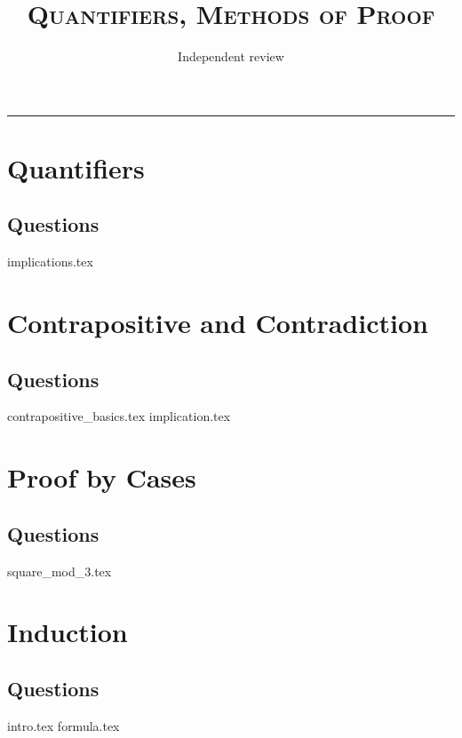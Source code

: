 \documentclass{exam}
\title{\textsc{Quantifiers, Methods of Proof}}
\date{Independent review}
\begin{document}
\maketitle
\rule{\textwidth}{0.15em}
\fontsize{12}{15}\selectfont
\thispagestyle{empty}

\section{Quantifiers}
\subsection{Questions}
\begin{questions}
{implications.tex}
\end{questions}

\section{Contrapositive and Contradiction}
\subsection{Questions}
\begin{questions}
{contrapositive_basics.tex}
{implication.tex}
\end{questions}

\section{Proof by Cases}
\subsection{Questions}
\begin{questions}
{square_mod_3.tex}
\end{questions}

\section{Induction}
\subsection{Questions}
\begin{questions}
{intro.tex}
{formula.tex}
\end{questions}
\end{document}
